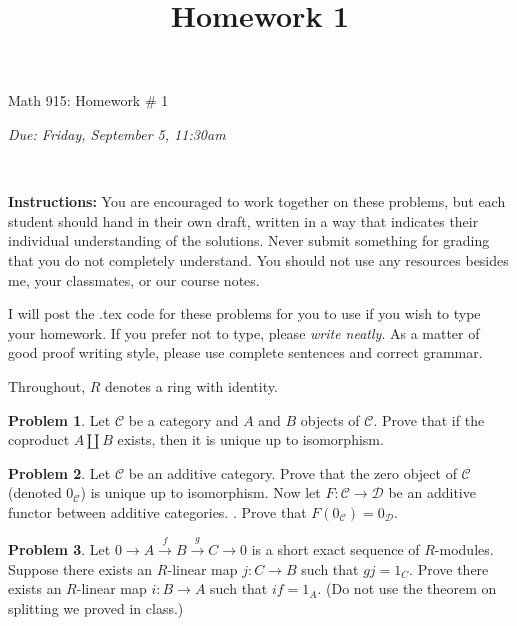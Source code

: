 \documentclass[11pt]{article}
\title{}
\date{\vspace{-0.5in}}
\title{Homework 1}
\theoremstyle{definition}
\newtheorem{problem}{Problem}
\begin{document}

\vspace{3em}

\begin{center}
	{\LARGE Math 915: Homework \# 1}
\end{center}
\begin{center}
{\it Due:  Friday, September 5, 11:30am}
\end{center}

\

\noindent
{\bf Instructions:}
You are encouraged to work together on these problems, but each student should hand in their own draft, written in a way that indicates their individual understanding of the solutions. Never submit something for grading that you do not completely understand. You should not use any resources besides me, your classmates, or our course notes.

\medskip
\noindent
I will post the .tex code for these problems for you to use if you wish to type your homework. If you prefer not to type, please  {\em write neatly}. As a matter of good proof writing style, please use complete sentences and correct grammar. 


\medskip
\noindent
Throughout, $R$ denotes a ring with identity.

\medskip

\begin{problem} Let $\mathcal C$ be a category and $A$ and $B$ objects of $\mathcal C$.   Prove that if the coproduct $A\coprod B$ exists, then it is unique up to isomorphism.
\end{problem}

\begin{problem} Let $\mathcal C$ be an additive category.  Prove that the zero object of $\mathcal C$ (denoted $0_{\mathcal C}$) is unique up to isomorphism.  Now let $F:\mathcal C\to \mathcal D$ be an additive functor between additive categories. .  Prove that $F(0_{\mathcal C})=0_{\mathcal D}$.
\end{problem}

\begin{problem} Let $0\to A\xrightarrow{f} B\xrightarrow{g} C\to 0$ is a short exact sequence of $R$-modules.  Suppose there exists an $R$-linear map $j:C\to B$ such that $gj=1_C$.   Prove there exists an $R$-linear map $i:B\to A$ such that $if=1_A$.  (Do not use the theorem on splitting we proved in class.)
\end{problem}
\end{document}
